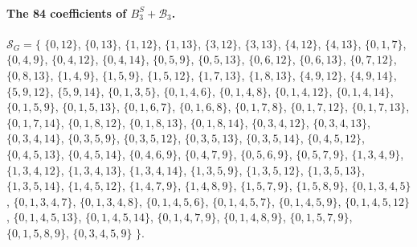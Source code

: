 \paragraph{The 84 coefficients of $B_3^S+\mathcal B_3$.}
\begingroup\small\raggedright
\noindent\(\mathcal S_G=\{\)
\(\{0,12\}\),\allowbreak\space
\(\{0,13\}\),\allowbreak\space
\(\{1,12\}\),\allowbreak\space
\(\{1,13\}\),\allowbreak\space
\(\{3,12\}\),\allowbreak\space
\(\{3,13\}\),\allowbreak\space
\(\{4,12\}\),\allowbreak\space
\(\{4,13\}\),\allowbreak\space
\(\{0,1,7\}\),\allowbreak\space
\(\{0,4,9\}\),\allowbreak\space
\(\{0,4,12\}\),\allowbreak\space
\(\{0,4,14\}\),\allowbreak\space
\(\{0,5,9\}\),\allowbreak\space
\(\{0,5,13\}\),\allowbreak\space
\(\{0,6,12\}\),\allowbreak\space
\(\{0,6,13\}\),\allowbreak\space
\(\{0,7,12\}\),\allowbreak\space
\(\{0,8,13\}\),\allowbreak\space
\(\{1,4,9\}\),\allowbreak\space
\(\{1,5,9\}\),\allowbreak\space
\(\{1,5,12\}\),\allowbreak\space
\(\{1,7,13\}\),\allowbreak\space
\(\{1,8,13\}\),\allowbreak\space
\(\{4,9,12\}\),\allowbreak\space
\(\{4,9,14\}\),\allowbreak\space
\(\{5,9,12\}\),\allowbreak\space
\(\{5,9,14\}\),\allowbreak\space
\(\{0,1,3,5\}\),\allowbreak\space
\(\{0,1,4,6\}\),\allowbreak\space
\(\{0,1,4,8\}\),\allowbreak\space
\(\{0,1,4,12\}\),\allowbreak\space
\(\{0,1,4,14\}\),\allowbreak\space
\(\{0,1,5,9\}\),\allowbreak\space
\(\{0,1,5,13\}\),\allowbreak\space
\(\{0,1,6,7\}\),\allowbreak\space
\(\{0,1,6,8\}\),\allowbreak\space
\(\{0,1,7,8\}\),\allowbreak\space
\(\{0,1,7,12\}\),\allowbreak\space
\(\{0,1,7,13\}\),\allowbreak\space
\(\{0,1,7,14\}\),\allowbreak\space
\(\{0,1,8,12\}\),\allowbreak\space
\(\{0,1,8,13\}\),\allowbreak\space
\(\{0,1,8,14\}\),\allowbreak\space
\(\{0,3,4,12\}\),\allowbreak\space
\(\{0,3,4,13\}\),\allowbreak\space
\(\{0,3,4,14\}\),\allowbreak\space
\(\{0,3,5,9\}\),\allowbreak\space
\(\{0,3,5,12\}\),\allowbreak\space
\(\{0,3,5,13\}\),\allowbreak\space
\(\{0,3,5,14\}\),\allowbreak\space
\(\{0,4,5,12\}\),\allowbreak\space
\(\{0,4,5,13\}\),\allowbreak\space
\(\{0,4,5,14\}\),\allowbreak\space
\(\{0,4,6,9\}\),\allowbreak\space
\(\{0,4,7,9\}\),\allowbreak\space
\(\{0,5,6,9\}\),\allowbreak\space
\(\{0,5,7,9\}\),\allowbreak\space
\(\{1,3,4,9\}\),\allowbreak\space
\(\{1,3,4,12\}\),\allowbreak\space
\(\{1,3,4,13\}\),\allowbreak\space
\(\{1,3,4,14\}\),\allowbreak\space
\(\{1,3,5,9\}\),\allowbreak\space
\(\{1,3,5,12\}\),\allowbreak\space
\(\{1,3,5,13\}\),\allowbreak\space
\(\{1,3,5,14\}\),\allowbreak\space
\(\{1,4,5,12\}\),\allowbreak\space
\(\{1,4,7,9\}\),\allowbreak\space
\(\{1,4,8,9\}\),\allowbreak\space
\(\{1,5,7,9\}\),\allowbreak\space
\(\{1,5,8,9\}\),\allowbreak\space
\(\{0,1,3,4,5\}\),\allowbreak\space
\(\{0,1,3,4,7\}\),\allowbreak\space
\(\{0,1,3,4,8\}\),\allowbreak\space
\(\{0,1,4,5,6\}\),\allowbreak\space
\(\{0,1,4,5,7\}\),\allowbreak\space
\(\{0,1,4,5,9\}\),\allowbreak\space
\(\{0,1,4,5,12\}\),\allowbreak\space
\(\{0,1,4,5,13\}\),\allowbreak\space
\(\{0,1,4,5,14\}\),\allowbreak\space
\(\{0,1,4,7,9\}\),\allowbreak\space
\(\{0,1,4,8,9\}\),\allowbreak\space
\(\{0,1,5,7,9\}\),\allowbreak\space
\(\{0,1,5,8,9\}\),\allowbreak\space
\(\{0,3,4,5,9\}\)\allowbreak\space
\(\}.\)\par
\endgroup
